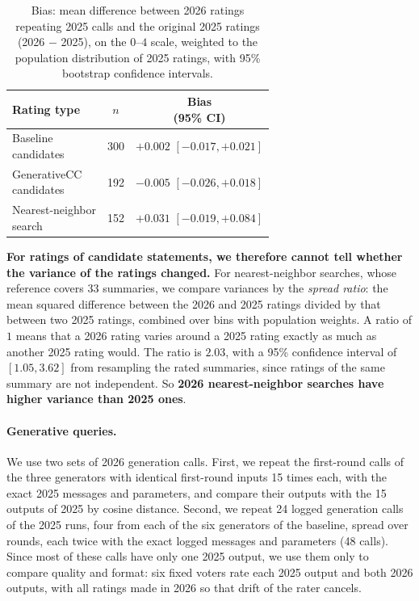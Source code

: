 \documentclass[letterpaper]{article} %
\begin{document}
\begin{table}[t]
\centering
\begin{tabular}{lcc}
\hline
Rating type & \(n\) & \makecell{Bias\\(95\% CI)} \\
\hline
\makecell[l]{Baseline\\candidates} & 300 & \makecell{\(+0.002\)\\\([-0.017, +0.021]\)} \\
\hline
\makecell[l]{GenerativeCC\\candidates} & 192 & \makecell{\(-0.005\)\\\([-0.026, +0.018]\)} \\
\hline
\makecell[l]{Nearest-neighbor\\search} & 152 & \makecell{\(+0.031\)\\\([-0.019, +0.084]\)} \\
\hline
\end{tabular}
\caption{Bias: mean difference between 2026 ratings repeating 2025 calls and the original 2025 ratings (2026 \(-\) 2025), on the \(0\)--\(4\) scale, weighted to the population distribution of 2025 ratings, with 95\% bootstrap confidence intervals.}
\label{tab:model-drift-ratings}
\end{table}

\textbf{For ratings of candidate statements, we therefore cannot tell whether the variance of the ratings changed.}
For nearest-neighbor searches, whose reference covers 33 summaries, we compare variances by the \emph{spread ratio}: the mean squared difference between the 2026 and 2025 ratings divided by that between two 2025 ratings, combined over bins with population weights.
A ratio of \(1\) means that a 2026 rating varies around a 2025 rating exactly as much as another 2025 rating would.
The ratio is \(2.03\), with a 95\% confidence interval of \([1.05, 3.62]\) from resampling the rated summaries, since ratings of the same summary are not independent.
So \textbf{2026 nearest-neighbor searches have higher variance than 2025 ones}.

\paragraph{Generative queries.}
We use two sets of 2026 generation calls.
First, we repeat the first-round calls of the three generators with identical first-round inputs 15 times each, with the exact 2025 messages and parameters, and compare their outputs with the 15 outputs of 2025 by cosine distance.
Second, we repeat 24 logged generation calls of the 2025 runs, four from each of the six generators of the baseline, spread over rounds, each twice with the exact logged messages and parameters (48 calls).
Since most of these calls have only one 2025 output, we use them only to compare quality and format: six fixed voters rate each 2025 output and both 2026 outputs, with all ratings made in 2026 so that drift of the rater cancels.
\end{document}
